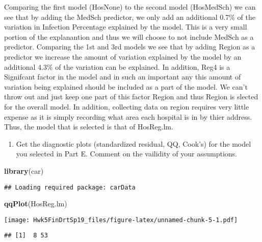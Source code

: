 \documentclass[]{article}
\newenvironment{Shaded}{\begin{snugshade}}{\end{snugshade}}
\newcommand{\KeywordTok}[1]{\textcolor[rgb]{0.13,0.29,0.53}{\textbf{#1}}}
\newcommand{\OperatorTok}[1]{\textcolor[rgb]{0.81,0.36,0.00}{\textbf{#1}}}
\newcommand{\NormalTok}[1]{#1}
\providecommand{\tightlist}{%
  \setlength{\itemsep}{0pt}\setlength{\parskip}{0pt}}
\begin{document}
Comparing the first model (HosNone) to the second model (HosMedSch) we
can see that by adding the MedSch predictor, we only add an additional
0.7\% of the variation in Infection Percentage explained by the model.
This is a very small portion of the explanantion and thus we will choose
to not include MedSch as a predictor. Comparing the 1st and 3rd models
we see that by adding Region as a predictor we increase the amount of
variation explained by the model by an additional 4.3\% of the variation
can be explained. In addition, Reg4 is a Signifcant factor in the model
and in such an important any this amount of variation being explained
should be included as a part of the model. We can't throw out and just
keep one part of this factor Region and thus Region is slected for the
overall model. In addition, collecting data on region requires very
little expense as it is simply recording what area each hospital is in
by thier address. Thus, the model that is selected is that of HosReg.lm.

\begin{enumerate}
\def\labelenumi{\Alph{enumi})}
\setcounter{enumi}{5}
\tightlist
\item
  Get the diagnostic plots (standardized residual, QQ, Cook's) for the
  model you selected in Part E. Comment on the vailidity of your
  assumptions.
\end{enumerate}

\begin{Shaded}
\begin{Highlighting}[]
\KeywordTok{library}\NormalTok{(car)}
\end{Highlighting}
\end{Shaded}

\begin{verbatim}
## Loading required package: carData
\end{verbatim}

\begin{Shaded}
\begin{Highlighting}[]
\KeywordTok{qqPlot}\NormalTok{(HosReg.lm)}
\end{Highlighting}
\end{Shaded}

\texttt{[image: Hwk5FinDrtSp19\_files/figure-latex/unnamed-chunk-5-1.pdf]}

\begin{verbatim}
## [1]  8 53
\end{verbatim}

\begin{Shaded}
\end{Shaded}
\end{document}
